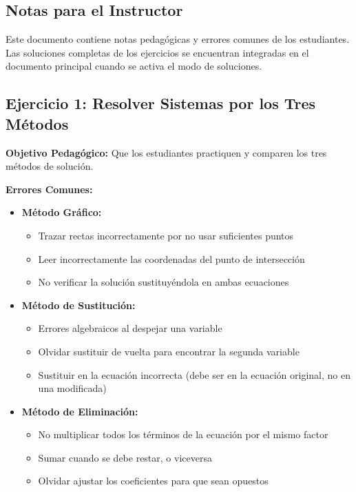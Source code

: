 
\subsection*{Notas para el Instructor}

Este documento contiene notas pedagógicas y errores comunes de los estudiantes. Las soluciones completas de los ejercicios se encuentran integradas en el documento principal cuando se activa el modo de soluciones.

\subsection*{Ejercicio 1: Resolver Sistemas por los Tres Métodos}

\textbf{Objetivo Pedagógico:} Que los estudiantes practiquen y comparen los tres métodos de solución.

\textbf{Errores Comunes:}

\begin{itemize}
    \item \textbf{Método Gráfico:}
    \begin{itemize}
        \item Trazar rectas incorrectamente por no usar suficientes puntos
        \item Leer incorrectamente las coordenadas del punto de intersección
        \item No verificar la solución sustituyéndola en ambas ecuaciones
    \end{itemize}

    \item \textbf{Método de Sustitución:}
    \begin{itemize}
        \item Errores algebraicos al despejar una variable
        \item Olvidar sustituir de vuelta para encontrar la segunda variable
        \item Sustituir en la ecuación incorrecta (debe ser en la ecuación original, no en una modificada)
    \end{itemize}

    \item \textbf{Método de Eliminación:}
    \begin{itemize}
        \item No multiplicar todos los términos de la ecuación por el mismo factor
        \item Sumar cuando se debe restar, o viceversa
        \item Olvidar ajustar los coeficientes para que sean opuestos
    \end{itemize}
\end{itemize}

